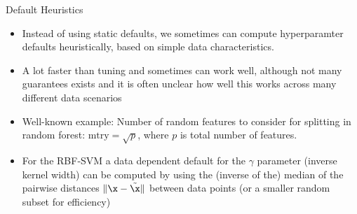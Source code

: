 \begin{frame}{Default Heuristics}

    \begin{itemize}
            \item Instead of using static defaults, we sometimes can compute hyperparamter defaults heuristically, based on simple data characteristics.
            \item A lot faster than tuning and sometimes can work well,
                although not many guarantees exists and it is often unclear how well this works across many different data scenarios
            \item Well-known example: Number of random features to consider for splitting in random forest: $\text{mtry} = \sqrt{p}$, where $p$ is total number of features.
            \item For the RBF-SVM a data dependent default for the $\gamma$ parameter (inverse kernel width) can be computed by using the (inverse of the) median of the pairwise distances $\|\x - \tilde \x \|$ between data points (or a smaller random subset for efficiency)
    \end{itemize}
\end{frame}




